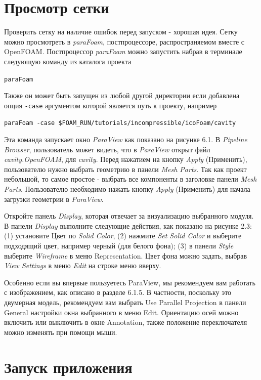 \section{Просмотр сетки}
\label{sec:2.1.2}

Проверить сетку на наличие ошибок перед запуском - хорошая идея.
 Сетку можно просмотреть в \textsl{paraFoam}, постпроцессоре, распространяемом вместе с OpenFOAM.
 Постпроцессор \textsl{paraFoam} можно запустить набрав в терминале следующую команду из каталога проекта 

\texttt{paraFoam}

Также он может быть запущен из любой другой директории если добавлена опция \texttt{-case} аргументом которой является
путь к проекту, например

\texttt{paraFoam -case \$FOAM\_RUN/tutorials/incompressible/icoFoam/cavity}

Эта команда запускает окно \textsl{ParaView} как показано на рисунке 6.1. В \textsl{Pipeline Browser},
 пользователь может видеть, что в \textsl{ParaView} открыт файл \textsl{cavity.OpenFOAM},
 для \textsl{cavity}. Перед нажатием на кнопку \textsl{Apply} (Применить),
 пользователю нужно выбрать геометрию в панели \textsl{Mesh Parts}. Так как проект небольшой, то самое простое - выбрать
 все компоненты в заголовке панели \textsl{Mesh Parts}. Пользователю необходимо нажать кнопку \textsl{Apply} (Применить)
для начала загрузки геометрии в \textsl{ParaView}.

Откройте панель \textsl{Display}, которая отвечает за визуализацию выбранного модуля. В панели \textsl{Display} выполните 
следующие действия, как показано на рисунке 2.3: (1) установите Цвет по \textsl{Solid Color},
 (2) нажмите \textsl{Set Solid Color} и выберите подходящий цвет, например черный (для белого фона);
 (3) в панели \textsl{Style} выберите \textsl{Wireframe} в меню Representation.
 Цвет фона можно задать, выбрав \textsl{View Settings} в меню \textsl{Edit} на строке меню вверху.

Особенно если вы впервые пользуетесь ParaView, мы рекомендуем вам работать с изображением, как описано в разделе 6.1.5.
 В частности, поскольку это двумерная модель, рекомендуем вам выбрать Use Parallel Projection
 в панели General настройки окна выбранного в меню Edit. Ориентацию осей можно включить или выключить
 в окне Annotation, также положение переключателя можно изменять при помощи мыши.

\section{Запуск приложения}
\label{sec:2.1.3}